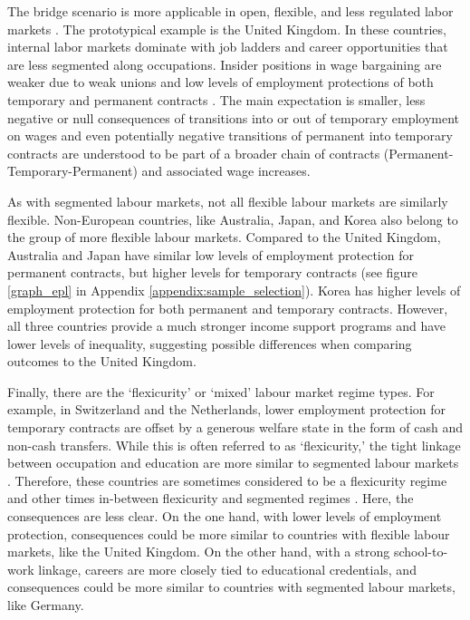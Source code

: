 \documentclass[12pt]{article}
\begin{document}
The bridge scenario is more applicable in open, flexible, and less regulated labor markets \citep{muffels_labour_2008}.  The prototypical example is the United Kingdom.  In these countries, internal labor markets dominate with job ladders and career opportunities that are less segmented along occupations. Insider positions in wage bargaining are weaker due to weak unions and low levels of employment protections of both temporary and permanent contracts \citep{giesecke_external_2004,gebel_early_2010}.  The main expectation is smaller, less negative or null consequences of transitions into or out of temporary employment on wages and even potentially negative transitions of permanent into temporary contracts are understood to be part of a broader chain of contracts (Permanent-Temporary-Permanent) and associated wage increases.  

As with segmented labour markets, not all flexible labour markets are similarly flexible.  Non-European countries, like Australia, Japan, and Korea also belong to the group of more flexible labour markets.  Compared to the United Kingdom, Australia and Japan have similar low levels of employment protection for permanent contracts, but higher levels for temporary contracts (see figure \ref{graph_epl} in Appendix \ref{appendix:sample_selection}).  Korea has higher levels of employment protection for both permanent and temporary contracts.  However, all three countries provide a much stronger income support programs and have lower levels of inequality, suggesting possible differences when comparing outcomes to the United Kingdom.

Finally, there are the `flexicurity' or `mixed' labour market regime types.  For example, in Switzerland and the Netherlands, lower employment protection for temporary contracts are offset by a generous welfare state in the form of cash and non-cash transfers.  While this is often referred to as `flexicurity,' the tight linkage between occupation and education are more similar to segmented labour markets \citep{hevenstone_2011,helbling_fixed-term_2017,eberlein_etal_2023,janietz_etal_2023}.  Therefore, these countries are sometimes considered to be a flexicurity regime and other times in-between flexicurity and segmented regimes \citep{barbieri_flexible_2009,muffels_labour_2008,gebel_is_2013}.  Here, the consequences are less clear.  On the one hand, with lower levels of employment protection, consequences could be more similar to countries with flexible labour markets, like the United Kingdom.  On the other hand, with a strong school-to-work linkage, careers are more closely tied to educational credentials, and consequences could be more similar to countries with segmented labour markets, like Germany.
\end{document}
